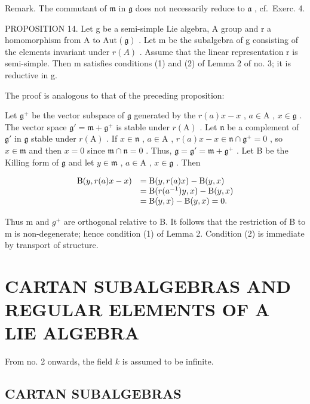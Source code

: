 Remark. The commutant of \(\mathfrak{m}\) in \(\mathfrak{g}\) does not necessarily reduce to \(\mathfrak{a}\) , cf.~Exerc. 4.

PROPOSITION 14. Let g be a semi-simple Lie algebra, A group and r a homomorphism from A to \(\text{Aut}(\mathfrak{g})\) . Let m be the subalgebra of g consisting of the elements invariant under \(r(A)\) . Assume that the linear representation r is semi-simple. Then m satisfies conditions (1) and (2) of Lemma 2 of no. 3; it is reductive in g.

The proof is analogous to that of the preceding proposition:

Let \(\mathfrak{g}^{+}\) be the vector subspace of \(\mathfrak{g}\) generated by the \(r(a)x - x\) , \(a \in \mathrm{A}\) , \(x \in \mathfrak{g}\) . The vector space \(\mathfrak{g}' = \mathfrak{m} + \mathfrak{g}^{+}\) is stable under \(r(\mathrm{A})\) . Let \(\mathfrak{n}\) be a complement of \(\mathfrak{g}'\) in \(\mathfrak{g}\) stable under \(r(\mathrm{A})\) . If \(x \in \mathfrak{n}\) , \(a \in \mathrm{A}\) , \(r(a)x - x \in \mathfrak{n} \cap \mathfrak{g}^{+} = 0\) , so \(x \in \mathfrak{m}\) and then \(x = 0\) since \(\mathfrak{m} \cap \mathfrak{n} = 0\) . Thus, \(\mathfrak{g} = \mathfrak{g}' = \mathfrak{m} + \mathfrak{g}^{+}\) . Let B be the Killing form of \(\mathfrak{g}\) and let \(y \in \mathfrak{m}\) , \(a \in \mathrm{A}\) , \(x \in \mathfrak{g}\) . Then

\[
\begin{array}{r l} \mathrm{B} (y, r (a) x - x) & = \mathrm{B} (y, r (a) x) - \mathrm{B} (y, x) \\ & = \mathrm{B} (r (a ^ {- 1}) y, x) - \mathrm{B} (y, x) \\ & = \mathrm{B} (y, x) - \mathrm{B} (y, x) = 0. \end{array}
\]

Thus m and \(g^{+}\) are orthogonal relative to B. It follows that the restriction of B to m is non-degenerate; hence condition (1) of Lemma 2. Condition (2) is immediate by transport of structure.

\section{CARTAN SUBALGEBRAS AND REGULAR ELEMENTS OF A LIE ALGEBRA}

From no. 2 onwards, the field \(k\) is assumed to be infinite.

\subsection{CARTAN SUBALGEBRAS}

